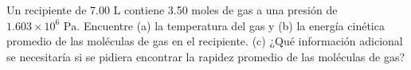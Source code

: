 \item Un recipiente de 7.00 L contiene 3.50 moles de gas a una presión de $1.603 \times 10^6\text{ Pa}$. Encuentre (a) la temperatura del gas y (b) la energía cinética promedio de las moléculas de gas en el recipiente. (c) ¿Qué información adicional se necesitaría si se pidiera encontrar la rapidez promedio de las moléculas de gas?
